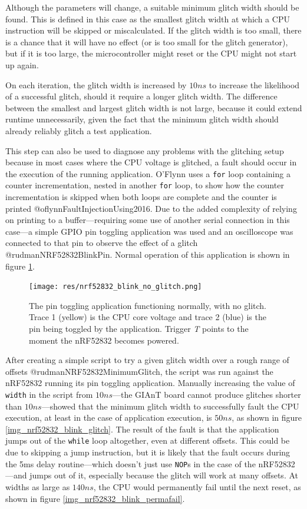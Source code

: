 Although the parameters will change, a suitable minimum glitch width
should be found. This is defined in this case as the smallest glitch
width at which a CPU instruction will be skipped or miscalculated. If
the glitch width is too small, there is a chance that it will have no
effect (or is too small for the glitch generator), but if it is too
large, the microcontroller might reset or the CPU might not start up
again.

On each iteration, the glitch width is increased by \(10ns\) to increase
the likelihood of a successful glitch, should it require a longer glitch
width. The difference between the smallest and largest glitch width is
not large, because it could extend runtime unnecessarily, given the fact
that the minimum glitch width should already reliably glitch a test
application.

This step can also be used to diagnose any problems with the glitching
setup because in most cases where the CPU voltage is glitched, a fault
should occur in the execution of the running application. O'Flynn uses a
\texttt{for} loop containing a counter incrementation, nested in another
\texttt{for} loop, to show how the counter incrementation is skipped
when both loops are complete and the counter is printed
@oflynnFaultInjectionUsing2016. Due to the added complexity of relying
on printing to a buffer---requiring some use of another serial
connection in this case---a simple GPIO pin toggling application was
used and an oscilloscope was connected to that pin to observe the effect
of a glitch @rudmanNRF52832BlinkPin. Normal operation of this
application is shown in figure \ref{img_nrf52832_blink_no_glitch}.

\begin{figure}
\centering
\texttt{[image: res/nrf52832\_blink\_no\_glitch.png]}
\caption{The pin toggling application functioning normally, with no
glitch. Trace 1 (yellow) is the CPU core voltage and trace 2 (blue) is
the pin being toggled by the application. Trigger \emph{T} points to the
moment the nRF52832 becomes
powered.\label{img_nrf52832_blink_no_glitch}}
\end{figure}

After creating a simple script to try a given glitch width over a rough
range of offsets @rudmanNRF52832MinimumGlitch, the script was run
against the nRF52832 running its pin toggling application. Manually
increasing the value of \texttt{width} in the script from \(10ns\)---the
GIAnT board cannot produce glitches shorter than \(10ns\)---showed that
the minimum glitch width to successfully fault the CPU execution, at
least in the case of application execution, is \(50ns\), as shown in
figure \ref{img_nrf52832_blink_glitch}. The result of the fault is that
the application jumps out of the \texttt{while} loop altogether, even at
different offsets. This could be due to skipping a jump instruction, but
it is likely that the fault occurs during the 5ms delay routine---which
doesn't just use \texttt{NOP}s in the case of the nRF52832---and jumps
out of it, especially because the glitch will work at many offsets. At
widths as large as \(140ns\), the CPU would permanently fail until the
next reset, as shown in figure \ref{img_nrf52832_blink_permafail}.

